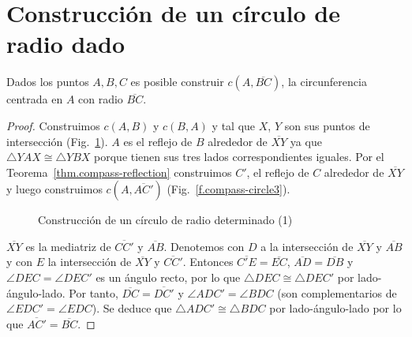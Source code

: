 
\section{Construcción de un círculo de radio dado}\label{s.circle}

\begin{theorem}\label{thm.compass-radius}
Dados los puntos $A,B,C$ es posible construir $c(A,\overline{BC})$, la circunferencia centrada en $A$ con radio $\overline{BC}$.
\end{theorem}

\begin{proof}
Construimos $c(A,B)$ y $c(B,A)$ y tal que $X$, $Y$ son sus puntos de intersección (Fig.~\ref{f.compass-circle1}). $A$ es el reflejo de $B$ alrededor de $\overline{XY}$ ya que $\triangle YAX\cong \triangle YBX$ porque tienen sus tres lados correspondientes iguales. Por el Teorema~\ref{thm.compass-reflection} construimos $C'$, el reflejo de $C$ alrededor de $\overline{XY}$ y luego construimos $c(A,\overline{AC'})$ (Fig.~\ref{f.compass-circle3}).

\begin{figure}[b]
\begin{center}
\end{center}
\caption{Construcción de un círculo de radio determinado (1)}\label{f.compass-circle1}
\end{figure}

$\overline{XY}$ es la mediatriz de $\overline{CC'}$ y $\overline{AB}$. Denotemos con $D$ a la intersección de $\overline{XY}$ y $\overline{AB}$ y con $E$ la intersección de $\overline{XY}$ y $\overline{CC'}$. Entonces $\overline{C'E}=\overline{EC}$, $\overline{AD}=\overline{DB}$ y $\angle DEC=\angle DEC'$ es un ángulo recto, por lo que $\triangle DEC\cong\triangle DEC'$ por lado-ángulo-lado. Por tanto, $\overline{DC}=\overline{DC'}$ y $\angle ADC'=\angle BDC$ (son complementarios de $\angle EDC'=\angle EDC$). Se deduce que $\triangle ADC'\cong\triangle BDC$ por lado-ángulo-lado por lo que $\overline{AC'}=\overline{BC}$.
\end{proof}

